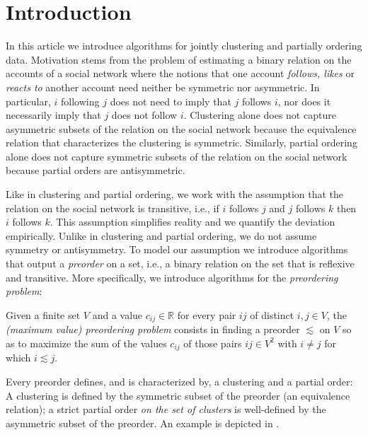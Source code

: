 \section{Introduction}
\label{sec:introduction}

In this article we introduce algorithms for jointly clustering and partially ordering data. 
Motivation stems from the problem of estimating a binary relation on the accounts of a social network where the notions that one account \emph{follows, likes} or \emph{reacts to} another account need neither be symmetric nor asymmetric.
In particular, $i$ following $j$ does not need to imply that $j$ follows $i$, nor does it necessarily imply that $j$ does not follow $i$.
Clustering alone does not capture asymmetric subsets of the relation on the social network because the equivalence relation that characterizes the clustering is symmetric.
Similarly, partial ordering alone does not capture symmetric subsets of the relation on the social network because partial orders are antisymmetric.

Like in clustering and partial ordering, we work with the assumption that the relation on the social network is transitive, i.e., if $i$ follows $j$ and $j$ follows $k$ then $i$ follows $k$.
This assumption simplifies reality and we quantify the deviation empirically.
Unlike in clustering and partial ordering, we do not assume symmetry or antisymmetry.
To model our assumption we introduce algorithms that output a \emph{preorder} on a set, i.e., a binary relation on the set that is reflexive and transitive.
More specifically, we introduce algorithms for the \emph{preordering problem}:

\begin{definition}\cite{wakabayashi1998complexity}
\label{definition:preordering-problem}
Given a finite set $V$ and a value $c_{ij} \in \mathbb{R}$ for every pair $ij$ of distinct $i,j \in V$, the \emph{(maximum value) preordering problem} consists in finding a preorder $\lesssim$ on $V$ so as to maximize the sum of the values $c_{ij}$ of those pairs $ij \in V^2$ with $i \neq j$ for which $i \lesssim j$.
\end{definition}
%
Every preorder defines, and is characterized by, a clustering and a partial order:
A clustering is defined by the symmetric subset of the preorder (an equivalence relation);
a strict partial order \emph{on the set of clusters} is well-defined by the asymmetric subset of the preorder.
An example is depicted in .

